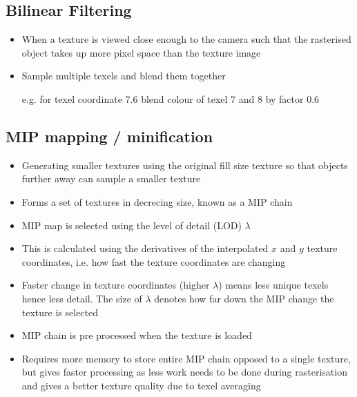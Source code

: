 \documentclass[a4paper]{article}
\begin{document}
\subsection{Bilinear Filtering}

\begin{itemize}
  \item
    When a texture is viewed close enough to the camera such that the rasterised
    object takes up more pixel space than the texture image

  \item
    Sample multiple texels and blend them together

    e.g. for texel coordinate 7.6 blend colour of texel 7 and 8 by factor 0.6

\end{itemize}

\subsection{MIP mapping /  minification}

\begin{itemize}
  \item
    Generating smaller textures using the original fill size texture so that
    objects further away can sample a smaller texture

  \item
    Forms a set of textures in decrecing size, known as a MIP chain

  \item
    MIP map is selected using the level of detail (LOD) $\lambda$

  \item
    This is calculated using the derivatives of the interpolated $x$ and $y$
    texture coordinates, i.e. how fast the texture coordinates are changing

  \item
    Faster change in texture coordinates (higher $\lambda$) means less unique
    texels hence less detail. The size of $\lambda$ denotes how far down the MIP
    change the texture is selected

  \item
    MIP chain is pre processed when the texture is loaded

  \item
    Requires more memory to store entire MIP chain opposed to a single texture,
    but gives faster processing as less work needs to be done during
    rasterisation and gives a better texture quality due to texel averaging

\end{itemize}
\end{document}
